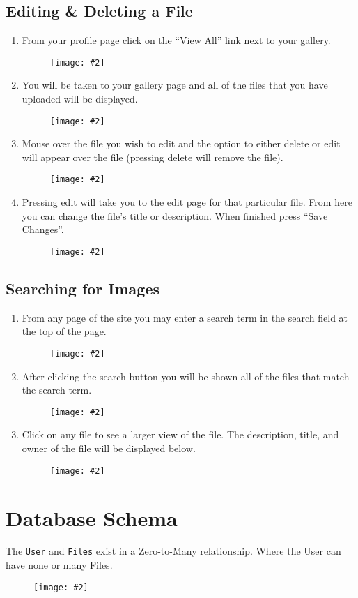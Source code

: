 \documentclass[11pt]{article}
\newcommand{\cmd}[1]{\textcolor{code}{\texttt{#1}}}
\newcommand{\image}[2][]{
    \begin{figure}[!htbp]\centering\texttt{[image: \#2]}\end{figure}
}
\begin{document}
		\subsection{Editing \& Deleting a File}
			\begin{enumerate}
				\item From your profile page click on the ``View All'' link next to your gallery. \image{images/edit delete 1.jpg}
				\item You will be taken to your gallery page and all of the files that you have uploaded will be displayed. \image{images/edit delete 2.jpg}
				\item Mouse over the file you wish to edit and the option to either delete or edit will appear over the file (pressing delete will remove the file). \image{images/edit delete 3.jpg}
				\item Pressing edit will take you to the edit page for that particular file. From here you can change the file's title or description. When finished press ``Save Changes''. \image{images/edit delete 5.jpg}
			\end{enumerate}
			
		\subsection{Searching for Images}
			\begin{enumerate}
				\item From any page of the site you may enter a search term in the search field at the top of the page. \image{images/search 1.jpg}
				\item After clicking the search button you will be shown all of the files that match the search term. \image{images/search 2.jpg}
				\item Click on any file to see a larger view of the file. The description, title, and owner of the file will be displayed below. \image{images/search 3.jpg}
			\end{enumerate}

\clearpage
\newpage
\appendix
\section{Database Schema} \label{app:schema}
	The \cmd{User} and \cmd{Files} exist in a Zero-to-Many relationship. Where the User can have none or many Files.
	
	\image{images/diagram.png}
\end{document}
